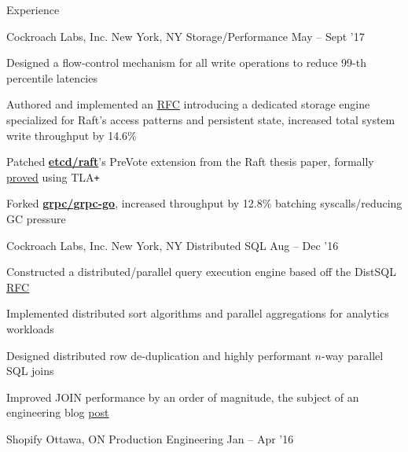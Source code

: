 \documentclass{resume} %
\begin{document}
\begin{rSection}{Experience}
  \begin{rSubsection}{Cockroach Labs, Inc.}
                     {New York, NY}
                     {Storage/Performance}
                     {May -- Sept '17}

    \item Designed a flow-control mechanism for all write operations to reduce
      99-th percentile latencies
    \item Authored and implemented an
      \href{https://github.com/cockroachdb/cockroach/pull/16361}{\underline {RFC}} introducing
      a dedicated storage
      engine specialized for Raft's access patterns and persistent state, increased
      total system write throughput by 14.6\%
    \item Patched
      \href{https://github.com/coreos/etcd/pull/8288}{\textbf{etcd/raft}}'s
      PreVote extension from the Raft thesis paper, formally
      \href{https://github.com/irfansharif/raft.tla/commit/22b05818b6bcfe6719a708f2270a1308fecbc0fa}{\underline {proved}}
      using TLA\texttt{+}
    \item Forked \href{https://github.com/irfansharif/grpc-go}{\textbf{grpc/grpc-go}},
      increased throughput by 12.8\% batching syscalls/reducing GC pressure
  \end{rSubsection}

  \begin{rSubsection}{Cockroach Labs, Inc.}
                     {New York, NY}
                     {Distributed SQL}
                     {Aug -- Dec '16}

    \item Constructed a distributed/parallel query execution engine based off
      the DistSQL
      \href{https://github.com/cockroachdb/cockroach/blob/master/docs/RFCS/20160421_distributed_sql.md}{\underline
      {RFC}}
    \item Implemented distributed sort algorithms and parallel aggregations for
      analytics workloads
    \item Designed distributed row de-duplication and highly performant $n$-way
      parallel SQL joins
    \item Improved JOIN performance by an order of magnitude, the
      subject of an engineering blog
      \href{https://www.cockroachlabs.com/blog/better-sql-joins-in-cockroachdb/}{\underline
      {post}}
  \end{rSubsection}

  \begin{rSubsection}{Shopify}
                     {Ottawa, ON}
                     {Production Engineering}
                     {Jan -- Apr '16}


\end{rSubsection}
\end{rSection}
\end{document}
